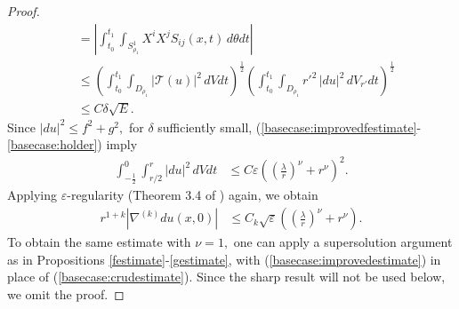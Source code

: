 \documentclass[12pt]{amsart}
\newcommand{\T}{{\mathcal T}}
\theoremstyle{others}
\numberwithin{equation}{section}
\newcommand{\eps}{\varepsilon}
\begin{document}
\begin{proof}
\begin{equation}
\begin{split}
& = \left| \int_{t_0}^{t_1} \!\!\!\!\! \int_{S^1_{\rho_1}} X^i X^j S_{ij} (x,t) \, d\theta dt \right| \\
& \leq \left( \int_{t_0}^{t_1} \!\!\!\!\! \int_{D_{\rho_1}} |\T(u)|^2 \, dV dt  \right)^{\frac12} \left( \int_{t_0}^{t_1} \!\!\!\!\!  \int_{D_{\rho_1}} r'^2 \, |du|^2 \, dV_{r'} dt \right)^{\frac12} \\
& \leq C \delta \sqrt{E}.
\end{split}
\end{equation}
Since $|du|^2 \leq f^2 + g^2,$ for $\delta$ sufficiently small, (\ref{basecase:improvedfestimate}-\ref{basecase:holder}) imply
\begin{equation*}
\begin{split}
\int_{-\frac12}^0 \int_{r/2}^r |du|^2 \, dV dt & \leq C \eps \left( \left( \frac{\lambda}{r} \right)^\nu  + r^\nu \right)^2.
\end{split}
\end{equation*}
Applying $\eps$-regularity (Theorem 3.4 of \cite{songwaldron}) again, we obtain
\begin{equation}\label{basecase:improvedestimate}
\begin{split}
r^{1 + k} |\nabla^{(k)} du(x,0)| & \leq C_k \sqrt{\eps} \left( \left( \frac{\lambda}{r} \right)^\nu  + r^\nu \right).
\end{split}
\end{equation}
To obtain the same estimate with $\nu = 1,$ one can apply a supersolution argument as in Propositions \ref{festimate}-\ref{gestimate}, with (\ref{basecase:improvedestimate}) in place of (\ref{basecase:crudestimate}). Since the sharp result will not be used below, we omit the proof. %
\end{proof}
\end{document}
